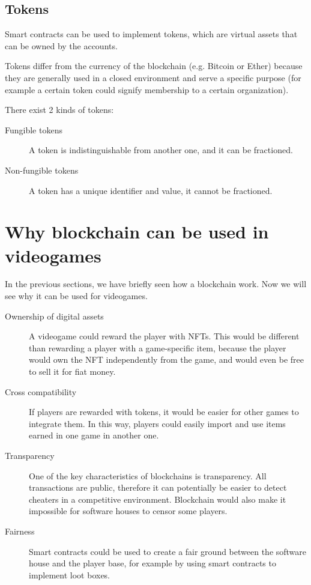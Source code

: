 \documentclass[11pt]{article}
\begin{document}
\subsection{Tokens} \label{subsection:tokens}
Smart contracts can be used to implement tokens, which are virtual assets that can be owned by the accounts.

Tokens differ from the currency of the blockchain (e.g. Bitcoin or Ether) because they are generally used in a closed environment and serve a specific purpose (for example a certain token could signify membership to a certain organization).

There exist 2 kinds of tokens:
\begin{description}
    \item[Fungible tokens] A token is indistinguishable from another one, and it can be fractioned. 
    \item[Non-fungible tokens] A token has a unique identifier and value, it cannot be fractioned. 
\end{description}

\section{Why blockchain can be used in videogames} \label{section:wbcbuiv}
In the previous sections, we have briefly seen how a blockchain work. Now we will see why it can be used for videogames.
\begin{description}
    \item[Ownership of digital assets] A videogame could reward the player with NFTs. This would be different than rewarding a player with a game-specific item, because the player would own the NFT independently from the game, and would even be free to sell it for fiat money.
    \item[Cross compatibility] If players are rewarded with tokens, it would be easier for other games to integrate them. In this way, players could easily import and use items earned in one game in another one.
    \item[Transparency] One of the key characteristics of blockchains is transparency. All transactions are public, therefore it can potentially be easier to detect cheaters in a competitive environment. Blockchain would also make it impossible for software houses to censor some players.
    \item[Fairness] Smart contracts could be used to create a fair ground between the software house and the player base, for example by using smart contracts to implement loot boxes.  
\end{description}
\end{document}
